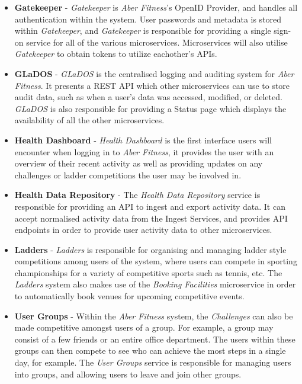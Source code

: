 \begin{itemize}
	\item \textbf{Gatekeeper} - \textit{Gatekeeper} is \textit{Aber Fitness}'s OpenID Provider, and handles all authentication within the system. User passwords and metadata is stored within \textit{Gatekeeper}, and \textit{Gatekeeper} is responsible for providing a single sign-on service for all of the various microservices. Microservices will also utilise \textit{Gatekeeper} to obtain tokens to utilize eachother's APIs.

	\item \textbf{GLaDOS} - \textit{GLaDOS} is the centralised logging and auditing system for \textit{Aber Fitness}. It presents a REST API which other microservices can use to store audit data, such as when a user's data was accessed, modified, or deleted. \textit{GLaDOS} is also responsible for providing a Status page which displays the availability of all the other microservices.

	\item \textbf{Health Dashboard} - \textit{Health Dashboard} is the first interface users will encounter when logging in to \textit{Aber Fitness}, it provides the user with an overview of their recent activity as well as providing updates on any challenges or ladder competitions the user may be involved in.

	\item \textbf{Health Data Repository} - The \textit{Health Data Repository} service is responsible for providing an API to ingest and export activity data. It can accept normalised activity data from the Ingest Services, and provides API endpoints in order to provide user activity data to other microservices. 

	\item \textbf{Ladders} - \textit{Ladders} is responsible for organising and managing ladder style competitions among users of the system, where users can compete in sporting championships for a variety of competitive sports such as tennis, etc. The \textit{Ladders} system also makes use of the \textit{Booking Facilities} microservice in order to automatically book venues for upcoming competitive events.

	\item \textbf{User Groups} - Within the \textit{Aber Fitness} system, the \textit{Challenges} can also be made competitive amongst users of a group. For example, a group may consist of a few friends or an entire office department. The users within these groups can then compete to see who can achieve the most steps in a single day, for example. The \textit{User Groups} service is responsible for managing users into groups, and allowing users to leave and join other groups.

\end{itemize}